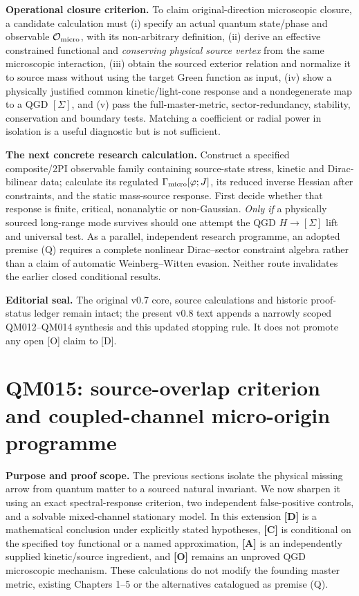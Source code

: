 \documentclass[11pt,a4paper]{article}
\begin{document}
\textbf{Operational closure criterion.} To claim original-direction microscopic closure, a candidate calculation must (i) specify an actual quantum state/phase and observable $\mathcal O_{\rm micro}$, with its non-arbitrary definition, (ii) derive an effective constrained functional and \emph{conserving physical source vertex} from the same microscopic interaction, (iii) obtain the sourced exterior relation and normalize it to source mass without using the target Green function as input, (iv) show a physically justified common kinetic/light-cone response and a nondegenerate map to a QGD $[\Sigma]$, and (v) pass the full-master-metric, sector-redundancy, stability, conservation and boundary tests. Matching a coefficient or radial power in isolation is a useful diagnostic but is not sufficient.

\textbf{The next concrete research calculation.} Construct a specified composite/2PI observable family containing source-state stress, kinetic and Dirac-bilinear data; calculate its regulated $\Gamma_{\rm micro}[\varphi;J]$, its reduced inverse Hessian after constraints, and the static mass-source response. First decide whether that response is finite, critical, nonanalytic or non-Gaussian. \emph{Only if} a physically sourced long-range mode survives should one attempt the QGD $H\to[\Sigma]$ lift and universal test. As a parallel, independent research programme, an adopted premise (Q) requires a complete nonlinear Dirac--sector constraint algebra rather than a claim of automatic Weinberg--Witten evasion. Neither route invalidates the earlier closed conditional results.

\textbf{Editorial seal.} The original v0.7 core, source calculations and historic proof-status ledger remain intact; the present v0.8 text appends a narrowly scoped QM012--QM014 synthesis and this updated stopping rule. It does not promote any open [O] claim to [D].



\section{QM015: source-overlap criterion and coupled-channel micro-origin programme}\label{sec:v09-qm015}
\textbf{Purpose and proof scope.} The previous sections isolate the physical missing arrow from quantum matter to a sourced natural invariant. We now sharpen it using an exact spectral-response criterion, two independent false-positive controls, and a solvable mixed-channel stationary model. In this extension \textbf{[D]} is a mathematical conclusion under explicitly stated hypotheses, \textbf{[C]} is conditional on the specified toy functional or a named approximation, \textbf{[A]} is an independently supplied kinetic/source ingredient, and \textbf{[O]} remains an unproved QGD microscopic mechanism. These calculations do not modify the founding master metric, existing Chapters 1--5 or the alternatives catalogued as premise (Q).
\end{document}

